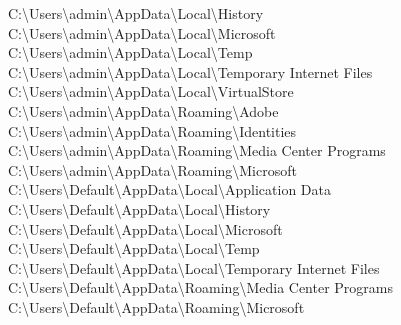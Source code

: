 C:\textbackslash Users\textbackslash admin\textbackslash AppData\textbackslash Local\textbackslash History \\
C:\textbackslash Users\textbackslash admin\textbackslash AppData\textbackslash Local\textbackslash Microsoft \\
C:\textbackslash Users\textbackslash admin\textbackslash AppData\textbackslash Local\textbackslash Temp \\
C:\textbackslash Users\textbackslash admin\textbackslash AppData\textbackslash Local\textbackslash Temporary Internet Files \\
C:\textbackslash Users\textbackslash admin\textbackslash AppData\textbackslash Local\textbackslash VirtualStore \\
C:\textbackslash Users\textbackslash admin\textbackslash AppData\textbackslash Roaming\textbackslash Adobe \\
C:\textbackslash Users\textbackslash admin\textbackslash AppData\textbackslash Roaming\textbackslash Identities \\
C:\textbackslash Users\textbackslash admin\textbackslash AppData\textbackslash Roaming\textbackslash Media Center Programs \\
C:\textbackslash Users\textbackslash admin\textbackslash AppData\textbackslash Roaming\textbackslash Microsoft \\
C:\textbackslash Users\textbackslash Default\textbackslash AppData\textbackslash Local\textbackslash Application Data \\
C:\textbackslash Users\textbackslash Default\textbackslash AppData\textbackslash Local\textbackslash History \\
C:\textbackslash Users\textbackslash Default\textbackslash AppData\textbackslash Local\textbackslash Microsoft \\
C:\textbackslash Users\textbackslash Default\textbackslash AppData\textbackslash Local\textbackslash Temp \\
C:\textbackslash Users\textbackslash Default\textbackslash AppData\textbackslash Local\textbackslash Temporary Internet Files \\
C:\textbackslash Users\textbackslash Default\textbackslash AppData\textbackslash Roaming\textbackslash Media Center Programs \\
C:\textbackslash Users\textbackslash Default\textbackslash AppData\textbackslash Roaming\textbackslash Microsoft \\

